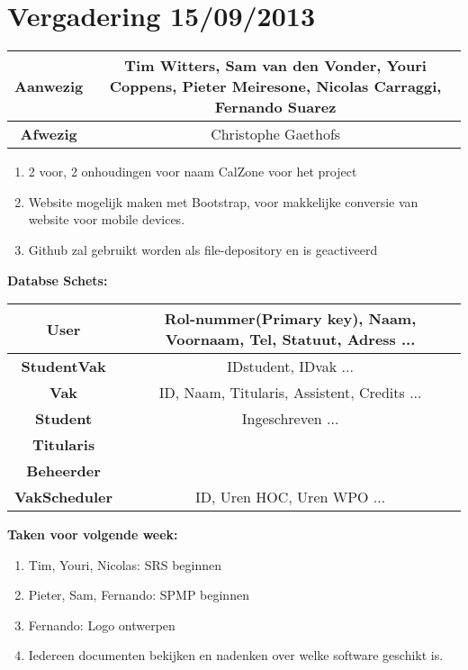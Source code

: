 \section{Vergadering 15/09/2013}
\begin{table}[htbp]
	\centering
	\begin{tabular}{c|c}
		\textbf{Aanwezig} & Tim Witters, Sam van den Vonder, Youri Coppens, Pieter Meiresone,  Nicolas Carraggi,  Fernando Suarez \\
		\hline
		\textbf{Afwezig} & Christophe Gaethofs \\
	\end{tabular}
\end{table}

\begin{enumerate}
	\item 2 voor, 2 onhoudingen voor naam CalZone voor het project \\
	\item Website mogelijk maken met Bootstrap, voor makkelijke conversie van website voor mobile devices. \\
	\item Github zal gebruikt worden als file-depository en is geactiveerd \\
\end{enumerate}

\noindent \textbf{Databse Schets:}

\begin{table}[htbp]
	\centering
	\begin{tabular}{c|c}
	\textbf{User} & Rol-nummer(Primary key), Naam, Voornaam, Tel, Statuut, Adress ... \\
	\hline
	\textbf{StudentVak} & IDstudent, IDvak ...\\
	\hline
	\textbf{Vak} & ID, Naam, Titularis, Assistent, Credits ...\\
	\hline
	\textbf{Student} & Ingeschreven ...\\
	\hline
	\textbf{Titularis} & \\
	\hline
	\textbf{Beheerder} & \\
	\hline
	\textbf{VakScheduler} & ID, Uren HOC, Uren WPO ...\\
	\end{tabular}
\end{table}

\noindent \textbf{Taken voor volgende week:}
\begin{enumerate}
	\item Tim, Youri, Nicolas: SRS beginnen
	\item Pieter, Sam, Fernando: SPMP beginnen
	\item Fernando: Logo ontwerpen
	\item Iedereen documenten bekijken en nadenken over welke software geschikt is.
\end{enumerate}
